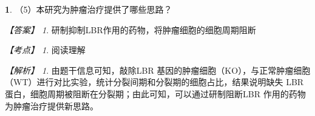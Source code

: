 \documentclass[UTF8, 10pt, a4paper, oneside]{ctexart}
\theoremstyle{definition}
\newtheorem{exercise}{}
\theoremstyle{remark}
\newtheorem*{answer}{【答案】}
\newtheorem*{point}{【考点】}      %
\newtheorem*{explanation}{【解析】}     %
\theoremstyle{plain}
\begin{document}
\begin{exercise}
    （5）本研究为肿瘤治疗提供了哪些思路？

    \begin{answer}
        研制抑制LBR作用的药物，将肿瘤细胞的细胞周期阻断
    \end{answer}
    \begin{point}
        阅读理解
    \end{point}
    \begin{explanation}
        由题干信息可知，敲除LBR 基因的肿瘤细胞（KO），与正常肿瘤细胞（WT）进行对比实验，统计分裂间期和分裂期的细胞占比，结果说明缺失 LBR 蛋白，细胞周期被阻断在分裂期；由此可知，可以通过研制阻断LBR 作用的药物为肿瘤治疗提供新思路。
    \end{explanation}
\end{exercise}
\end{document}
